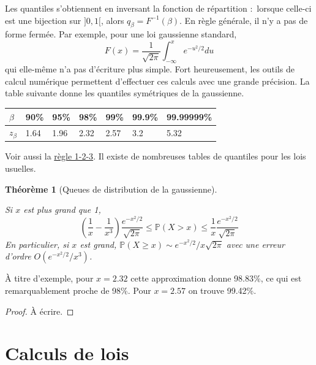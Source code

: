 \documentclass[
  10,
  letterpaper,
  DIV=11,
  numbers=noendperiod]{scrreport}
\theoremstyle{plain}
\newtheorem{theorem}{Théorème}[chapter]
\theoremstyle{definition}
\theoremstyle{plain}
\theoremstyle{definition}
\theoremstyle{definition}
\theoremstyle{plain}
\theoremstyle{remark}
\begin{document}
Les quantiles s'obtiennent en inversant la fonction de répartition
:~lorsque celle-ci est une bijection sur \(]0,1[\), alors
\(q_\beta = F^{-1}(\beta)\). En règle générale, il n'y a pas de forme
fermée. Par exemple, pour une loi gaussienne standard,
\[F(x) = \frac{1}{\sqrt{2\pi}}\int_{-\infty}^x e^{-u^2/2}du\] qui
elle-même n'a pas d'écriture plus simple. Fort heureusement, les outils
de calcul numérique permettent d'effectuer ces calculs avec une grande
précision. La table suivante donne les quantiles symétriques de la
gaussienne.

\begin{longtable}[]{@{}lllllll@{}}
\toprule\noalign{}
\(\beta\) & 90\% & 95\% & 98\% & 99\% & 99.9\% & 99.99999\% \\
\midrule\noalign{}
\endhead
\bottomrule\noalign{}
\endlastfoot
\(z_\beta\) & 1.64 & 1.96 & 2.32 & 2.57 & 3.2 & 5.32 \\
\end{longtable}

Voir aussi la
\href{https://en.wikipedia.org/wiki/68\%E2\%80\%9395\%E2\%80\%9399.7_rule}{règle
1-2-3}. Il existe de nombreuses tables de quantiles pour les lois
usuelles.

\begin{theorem}[Queues de distribution de la
gaussienne]\protect\hypertarget{thm-gaussiantail}{}\label{thm-gaussiantail}

Si \(x\) est plus grand que 1,
\[  \left(\frac{1}{x} - \frac{1}{x^3}\right) \frac{e^{-x^2/2}}{\sqrt{2\pi}}\leqslant \mathbb{P}(X > x) \leqslant \frac{1}{x}\frac{e^{-x^2/2}}{\sqrt{2\pi}} \]
En particulier, si \(x\) est grand,
\(\mathbb{P}(X \geqslant x) \sim e^{-x^2/2}/x\sqrt{2\pi}\) avec une
erreur d'ordre \(O(e^{-x^2/2}/x^3)\).

\end{theorem}

À titre d'exemple, pour \(x=2.32\) cette approximation donne 98.83\%, ce
qui est remarquablement proche de 98\%. Pour \(x = 2.57\) on trouve
99.42\%.

\begin{proof}

À écrire.

\end{proof}

\hypertarget{calculs-de-lois}{%
\section{Calculs de lois}\label{calculs-de-lois}}
\end{document}
